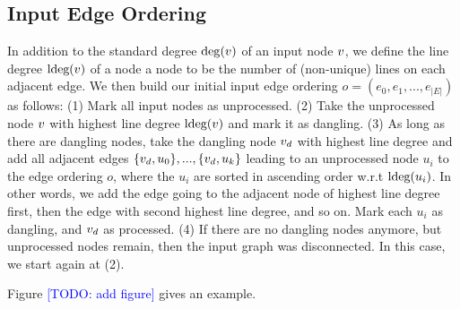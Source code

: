 \documentclass[sigconf]{acmart}
\newcommand\todo[1]{\textcolor{blue}{[TODO: #1]}}
\begin{document}
\subsection{Input Edge Ordering}

In addition to the standard degree $\deg(v)$ of an input node $v$, we define the line degree $\text{ldeg}(v)$ of a node a node to be the number of (non-unique) lines on each adjacent edge.
We then build our initial input edge ordering $o = (e_0, e_1, ..., e_{|E|})$ as follows:
  (1) Mark all input nodes as unprocessed.
  (2) Take the unprocessed node $v$ with highest line degree $\text{ldeg}(v)$ and mark it as dangling.
  (3) As long as there are dangling nodes, take the dangling node $v_d$ with highest line degree and add all adjacent edges $\{v_d, u_0\}, ..., \{v_d, u_k\}$ leading to an unprocessed node $u_i$ to the edge ordering $o$, where the $u_i$ are sorted in ascending order w.r.t $\text{ldeg}(u_i)$. In other words, we add the edge going to the adjacent node of highest line degree first, then the edge with second highest line degree, and so on. Mark each $u_i$ as dangling, and $v_d$ as processed. 
  (4) If there are no dangling nodes anymore, but unprocessed nodes remain, then the input graph was disconnected. In this case, we start again at (2).

Figure \todo{add figure} gives an example.
\end{document}

